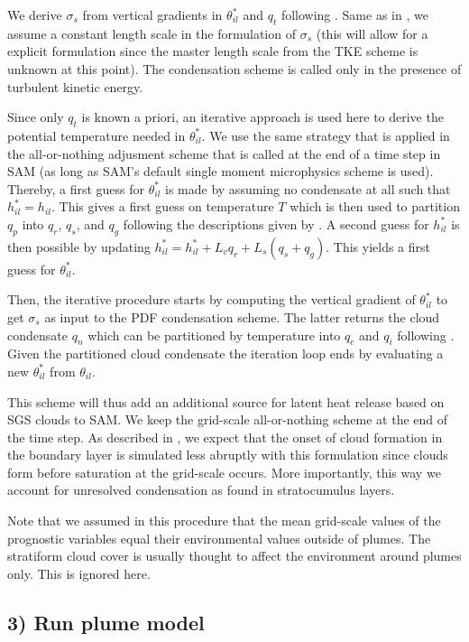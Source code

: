 \documentclass[dvipdfmx,a4paper,10pt]{article}
\begin{document}
We derive $\sigma_s$ from vertical gradients in $\theta^*_{il}$ and $q_t$ following \cite{bechtold95}. Same as in \cite{cheinet03b}, we assume a constant length scale in the formulation of $\sigma_s$ (this will allow for a explicit formulation since the master length scale from the TKE scheme is unknown at this point). The condensation scheme is called only in the presence of turbulent kinetic energy.  

Since only $q_t$ is known a priori, an iterative approach is used here to derive the potential temperature needed in  $\theta^*_{il}$. We use the same strategy that is applied in the all-or-nothing adjusment scheme that is called at the end of a time step in SAM (as long as SAM's default single moment microphysics scheme is used). Thereby, a first guess for $\theta^*_{il}$ is made by assuming no condensate at all such that  $h^*_{il}=h_{il}$. This gives a first guess on temperature $T$ which is then used to partition $q_p$ into $q_r$, $q_s$, and $q_g$ following the descriptions given by \cite{khairou03}. A second guess for $h^*_{il}$ is then possible by updating $h^*_{il}=h^*_{il}+L_v q_r + L_s (q_s+q_g)$. This yields a first guess for $\theta^*_{il}$.

Then, the iterative procedure starts by computing the vertical gradient of $\theta^*_{il}$ to get $\sigma_s$ as input to the PDF condensation scheme. The latter returns the cloud condensate $q_n$ which can be partitioned by temperature into $q_c$ and $q_i$ following \cite{khairou03}. Given the partitioned cloud condensate the iteration loop ends by evaluating a new $\theta^*_{il}$ from $\theta_{il}$.

This scheme will thus add an additional source for latent heat release based on SGS clouds to SAM. We keep the grid-scale all-or-nothing scheme at the end of the time step. As described in \cite{sommeria77}, we expect that the onset of cloud formation in the boundary layer is simulated less abruptly with this formulation since clouds form before saturation at the grid-scale occurs. More importantly, this way we account for unresolved condensation as found in stratocumulus layers.


Note that we assumed in this procedure that the mean grid-scale values of the prognostic variables equal their environmental values outside of plumes. The stratiform cloud cover is usually thought to affect the environment around plumes only. This is ignored here.

\subsection{3) Run plume model}
\end{document}
